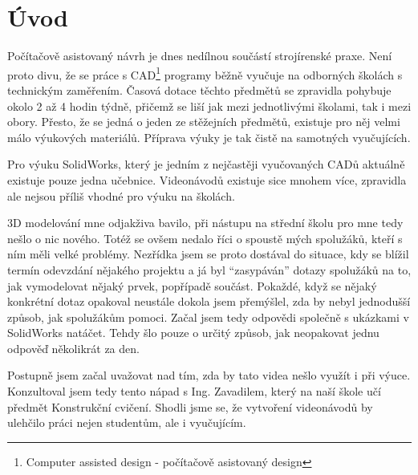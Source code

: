 \chapter*{Úvod}
Počítačově asistovaný návrh je dnes nedílnou součástí strojírenské praxe.
Není proto divu, že se práce s CAD\footnote{Computer assisted design - počítačově asistovaný design} programy běžně vyučuje na odborných školách s technickým zaměřením.
Časová dotace těchto předmětů se zpravidla pohybuje okolo 2 až 4 hodin týdně, přičemž se liší jak mezi jednotlivými školami, tak i mezi obory.
Přesto, že se jedná o jeden ze stěžejních předmětů, existuje pro něj velmi málo výukových materiálů.
Příprava výuky je tak čistě na samotných vyučujících.

Pro výuku SolidWorks, který je jedním z nejčastěji vyučovaných CADů aktuálně existuje pouze jedna učebnice.
Videonávodů existuje sice mnohem více, zpravidla ale nejsou příliš vhodné pro výuku na školách.

3D modelování mne odjakživa bavilo, při nástupu na střední školu pro mne tedy nešlo o nic nového.
Totéž se ovšem nedalo říci o spoustě mých spolužáků, kteří s ním měli velké problémy.
Nezřídka jsem se proto dostával do situace, kdy se blížil termín odevzdání nějakého projektu a já byl \enquote{zasypáván} dotazy spolužáků na to, jak vymodelovat nějaký prvek, popřípadě součást.
Pokaždé, když se nějaký konkrétní dotaz opakoval neustále dokola jsem přemýšlel, zda by nebyl jednodušší způsob, jak spolužákům pomoci.
Začal jsem tedy odpovědi společně s ukázkami v SolidWorks natáčet.
Tehdy šlo pouze o určitý způsob, jak neopakovat jednu odpověď několikrát za den.

Postupně jsem začal uvažovat nad tím, zda by tato videa nešlo využít i při výuce.
Konzultoval jsem tedy tento nápad s Ing. Zavadilem, který na naší škole učí předmět Konstrukční cvičení.
Shodli jsme se, že vytvoření videonávodů by ulehčilo práci nejen studentům, ale i vyučujícím.


\newpage
